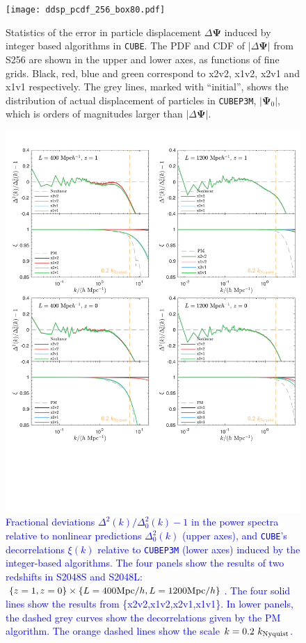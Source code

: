 \documentclass[10pt,twocolumn,preprint]{emulateapj}
\newcommand{\bs}{\boldsymbol}
\newcommand{\tcb}{\textcolor{blue}}
\begin{document}
\begin{figure}[]
\centering
  \texttt{[image: ddsp\_pcdf\_256\_box80.pdf]}
 \caption{Statistics of the error in particle displacement $\Delta{\bs\Psi}$ induced by integer based algorithms in {\tt CUBE}. The PDF and CDF of $|\Delta{\bs\Psi}|$ from S256 are shown in the upper and lower axes, as functions of fine grids. Black, red, blue and green correspond to x2v2, x1v2, x2v1 and x1v1 respectively. The grey lines, marked with ``initial'', shows the distribution of actual displacement of particles in {\tt CUBEP3M}, $|{\bs\Psi}_0|$, which is orders of magnitudes larger than $|\Delta{\bs\Psi}|$. }
\label{fig.dsp}
\end{figure}


\begin{figure}
\centering
  \includegraphics[width=1.0\linewidth]{ccc.pdf}
 \caption{\tcb{Fractional deviations $\Delta^2(k)/\Delta^2_0(k)-1$ in the power spectra relative to nonlinear predictions $\Delta^2_0(k)$ (upper axes), and {\tt CUBE}'s decorrelations $\xi(k)$ relative to {\tt CUBEP3M} (lower axes) induced by the integer-based algorithms. The four panels show the results of two redshifts in S2048S and S2048L: $\{ z=1, z=0 \} \times \{ L=400{\rm Mpc}/h, L=1200{\rm Mpc}/h \}$. The four solid lines show the results from \{x2v2,x1v2,x2v1,x1v1\}. In lower panels, the dashed grey curves show the decorrelations given by the PM algorithm. The orange dashed lines show the scale $k=0.2\ k_{\rm Nyquist}$.}}
\label{fig.ccc}
\end{figure}
\end{document}
